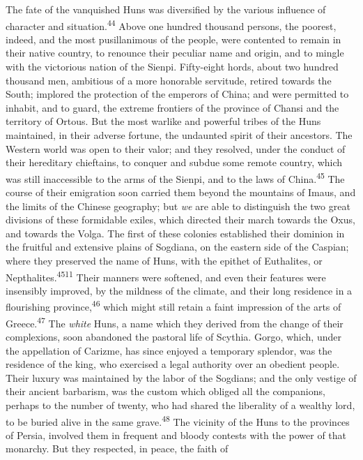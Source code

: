 The fate of the vanquished Huns was diversified by the various
influence of character and situation.\textsuperscript{44} Above one hundred
thousand persons, the poorest, indeed, and the most pusillanimous
of the people, were contented to remain in their native country,
to renounce their peculiar name and origin, and to mingle with
the victorious nation of the Sienpi. Fifty-eight hords, about two
hundred thousand men, ambitious of a more honorable servitude,
retired towards the South; implored the protection of the
emperors of China; and were permitted to inhabit, and to guard,
the extreme frontiers of the province of Chansi and the territory
of Ortous. But the most warlike and powerful tribes of the Huns
maintained, in their adverse fortune, the undaunted spirit of
their ancestors. The Western world was open to their valor; and
they resolved, under the conduct of their hereditary chieftains,
to conquer and subdue some remote country, which was still
inaccessible to the arms of the Sienpi, and to the laws of China.\textsuperscript{45}
The course of their emigration soon carried them beyond the
mountains of Imaus, and the limits of the Chinese geography; but
\textit{we} are able to distinguish the two great divisions of these
formidable exiles, which directed their march towards the Oxus,
and towards the Volga. The first of these colonies established
their dominion in the fruitful and extensive plains of Sogdiana,
on the eastern side of the Caspian; where they preserved the name
of Huns, with the epithet of Euthalites, or Nepthalites.\textsuperscript{4511}
Their manners were softened, and even their features were
insensibly improved, by the mildness of the climate, and their
long residence in a flourishing province,\textsuperscript{46} which might still
retain a faint impression of the arts of Greece.\textsuperscript{47} The \textit{white}
Huns, a name which they derived from the change of their
complexions, soon abandoned the pastoral life of Scythia. Gorgo,
which, under the appellation of Carizme, has since enjoyed a
temporary splendor, was the residence of the king, who exercised
a legal authority over an obedient people. Their luxury was
maintained by the labor of the Sogdians; and the only vestige of
their ancient barbarism, was the custom which obliged all the
companions, perhaps to the number of twenty, who had shared the
liberality of a wealthy lord, to be buried alive in the same
grave.\textsuperscript{48} The vicinity of the Huns to the provinces of Persia,
involved them in frequent and bloody contests with the power of
that monarchy. But they respected, in peace, the faith of
